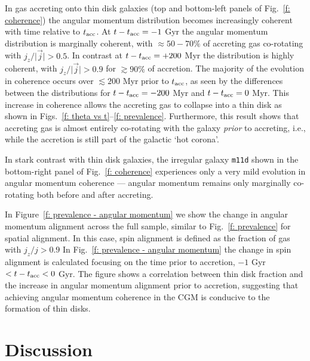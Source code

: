 \documentclass[fleqn,usenatbib]{mnras}
\newcommand{\tacc}{t_{\rm acc}}
\begin{document}
In gas accreting onto thin disk galaxies (top and bottom-left panels of Fig.~\ref{f: coherence}) the angular momentum distribution becomes increasingly coherent with time relative to $\tacc$.
At $t-\tacc=-1$ Gyr the angular momentum distribution is marginally coherent, with $\approx50-70\%$ of accreting gas co-rotating with $j_z/\vert \vec j \vert > 0.5$.
In contrast at $t-\tacc=+200$ Myr the distribution is highly coherent, with $j_z/\vert \vec j \vert > 0.9$ for $\gtrsim 90\%$ of accretion.
The majority of the evolution in coherence occurs over $\lesssim 200$ Myr prior to $\tacc$, as seen by the differences between the distributions for $t-\tacc=-200$ Myr and $t-\tacc=0$ Myr.
This increase in coherence allows the accreting gas to collapse into a thin disk as shown in Figs.~\ref{f: theta vs t}--\ref{f: prevalence}.
Furthermore, this result shows that accreting gas is almost entirely co-rotating with the galaxy {\em prior} to accreting, i.e., while the accretion is still part of the galactic `hot corona'. 

In stark contrast with thin disk galaxies, the irregular galaxy \texttt{m11d} shown in the bottom-right panel of Fig.~\ref{f: coherence} experiences only a very mild evolution in angular momentum coherence --- angular momentum remains only marginally co-rotating both before and after accreting.

In Figure~\ref{f: prevalence - angular momentum} we show the change in angular momentum alignment across the full sample, similar to Fig.~\ref{f: prevalence} for spatial alignment. 
In this case, spin alignment is defined as the fraction of gas with $j_z/j > 0.9$
In Fig.~\ref{f: prevalence - angular momentum} the change in spin alignment is calculated focusing on the time prior to accretion, $-1$ Gyr $< t - \tacc < 0$ Gyr.
The figure shows a correlation between thin disk fraction and the increase in angular momentum alignment prior to accretion, suggesting that achieving angular momentum coherence in the CGM is conducive to the formation of thin disks.

\section{Discussion}
\label{s: discussion}
\end{document}
